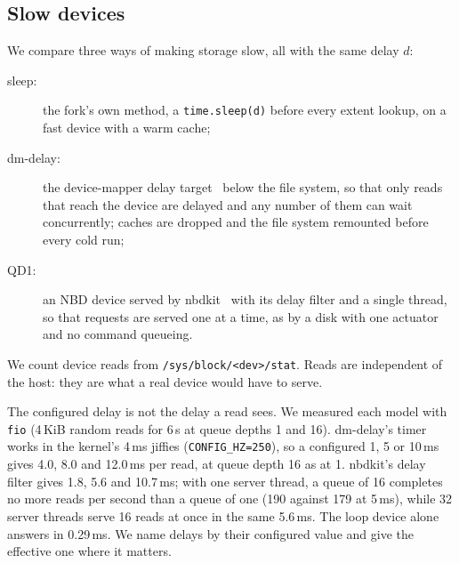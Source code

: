 \subsection{Slow devices}
We compare three ways of making storage slow, all with the same delay $d$:
\begin{description}
\item[sleep:] the fork's own method, a \texttt{time.sleep(d)} before every extent
  lookup, on a fast device with a warm cache;
\item[dm-delay:] the device-mapper delay target~\cite{kerneldmdelay} below the file
  system, so that only reads that reach the device are delayed and any number of
  them can wait concurrently; caches are dropped and the file system remounted
  before every cold run;
\item[QD1:] an NBD device served by nbdkit~\cite{nbdkit} with its delay filter and a
  single thread, so that requests are served one at a time, as by a disk with one
  actuator and no command queueing.
\end{description}
We count device reads from \texttt{/sys/block/<dev>/stat}. Reads are independent
of the host: they are what a real device would have to serve.

The configured delay is not the delay a read sees. We measured each model with
\texttt{fio} (4\,KiB random reads for 6\,s at queue depths 1 and 16). dm-delay's timer
works in the kernel's 4\,ms jiffies (\texttt{CONFIG\_HZ=250}), so a configured 1, 5 or
10\,ms gives 4.0, 8.0 and 12.0\,ms per read, at queue depth 16 as at 1. nbdkit's delay
filter gives 1.8, 5.6 and 10.7\,ms; with one server thread, a queue of 16 completes no
more reads per second than a queue of one (190 against 179 at 5\,ms), while 32 server
threads serve 16 reads at once in the same 5.6\,ms. The loop device alone answers in
0.29\,ms. We name delays by their configured value and give the effective one where it
matters.

